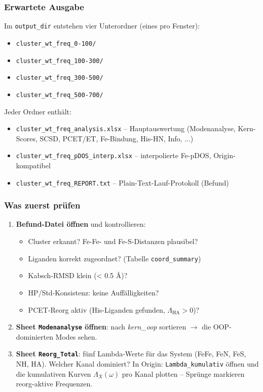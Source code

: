 \documentclass[11pt,a4paper,twoside]{article}
\theoremstyle{remark}
\begin{document}
\subsubsection*{Erwartete Ausgabe}

Im \texttt{output\_dir} entstehen vier Unterordner (eines pro Fenster):

\begin{itemize}
  \item \texttt{cluster\_wt\_freq\_0-100/}
  \item \texttt{cluster\_wt\_freq\_100-300/}
  \item \texttt{cluster\_wt\_freq\_300-500/}
  \item \texttt{cluster\_wt\_freq\_500-700/}
\end{itemize}

Jeder Ordner enth\"alt:

\begin{itemize}
  \item \texttt{cluster\_wt\_freq\_analysis.xlsx} -- Hauptauswertung
        (Modenanalyse, Kern-Scores, SCSD, PCET/ET, Fe-Bindung,
        His-HN, Info, ...)
  \item \texttt{cluster\_wt\_freq\_pDOS\_interp.xlsx} -- interpolierte
        Fe-pDOS, Origin-kompatibel
  \item \texttt{cluster\_wt\_freq\_REPORT.txt} -- Plain-Text-Lauf-Protokoll (Befund)
\end{itemize}

\subsubsection*{Was zuerst pr\"ufen}

\begin{enumerate}
  \item \textbf{Befund-Datei \"offnen} und kontrollieren:
    \begin{itemize}
      \item Cluster erkannt? Fe-Fe- und Fe-S-Distanzen plausibel?
      \item Liganden korrekt zugeordnet?
            (Tabelle \texttt{coord\_summary})
      \item Kabsch-RMSD klein (< 0.5 \AA{})?
      \item HP/Std-Konsistenz: keine Auff\"alligkeiten?
      \item PCET-Reorg aktiv (His-Liganden gefunden,
            $\Lambda_\text{HA} > 0$)?
    \end{itemize}
  \item \textbf{Sheet \texttt{Modenanalyse} \"offnen}: nach
        \emph{kern\_oop} sortieren $\to$ die OOP-dominierten Modes
        sehen.
  \item \textbf{Sheet \texttt{Reorg\_Total}}: f\"unf Lambda-Werte
        f\"ur das System (FeFe, FeN, FeS, NH, HA). Welcher Kanal
        dominiert? In Origin: \texttt{Lambda\_kumulativ} \"offnen
        und die kumulativen Kurven $\Lambda_X(\omega)$ pro Kanal
        plotten -- Spr\"unge markieren reorg-aktive Frequenzen.
\end{enumerate}
\end{document}
